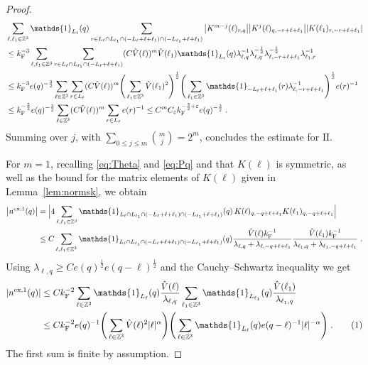 \documentclass[12pt,a4paper]{article}
\numberwithin{equation}{section}
\newcommand{\1}{\mathbb{I}}
\newcommand{\ex}{\mathrm{ex}}
\newcommand{\F}{\mathrm{F}}
\newcommand{\II}{\mathrm{II}}
\newcommand{\kF}{k_\F}
\newcommand{\tagg}[1]{ \stepcounter{equation} \tag{\theequation}
\label{#1} } %
\newcommand{\Zstar}{\mathbb{Z}^3} %
\newcommand{\Z}{\mathbb{Z}}
\newcommand{\half}{\frac{1}{2}}
\theoremstyle{plain}
\theoremstyle{definition}
\theoremstyle{remark}
\theoremstyle{plain}
\theoremstyle{definition}
\theoremstyle{remark}
\begin{document}
\begin{proof}
\begin{align}
	&\sum_{\ell,\ell_1 \in \Zstar}
		\mathds{1}_{L_\ell}(q)
		\sum_{r\in L_{\ell} \cap L_{\ell_1} \cap (-L_{\ell}+\ell+\ell_1) \cap (-L_{\ell_1}+\ell+\ell_1 )}
		\abs{K^{m-j}(\ell)_{r,q}}
		\abs{K^j(\ell)_{q,-r+\ell+\ell_1}}
		\abs{K(\ell_1)_{r,-r+\ell+\ell_1}} \nonumber\\
	&\leq \kF^{-3} \sum_{\ell,\ell_1 \in \Zstar} \sum_{r \in L_\ell \cap L_{\ell_1} \cap (-L_{\ell}+\ell+\ell_1)}
		(C \hat{V}(\ell))^m \hat{V}(\ell_1)
		\mathds{1}_{L_\ell}(q)
		\lambda_{\ell,q}^{-1} \lambda_{\ell,q}^{-\half} \lambda_{\ell,-r+\ell+\ell_1}^{-\half} \lambda_{\ell_1,r}^{-1} \nonumber\\
	&\leq \kF^{-3} e(q)^{-\frac 32} \sum_{\ell \in \Zstar} \sum_{r \in L_\ell}
		(C \hat{V}(\ell))^m
		\Bigg( \sum_{\ell_1 \in \Zstar} \hat{V}(\ell_1)^2  \Bigg)^{\half}
		\Bigg( \sum_{\ell_1 \in \Z^3} \mathds{1}_{-L_{\ell}+\ell+\ell_1}(r) \lambda_{\ell,-r+\ell+\ell_1}^{-1} \Bigg)^{\half}
		 e(r)^{-1} \nonumber\\
	&\leq \kF^{-\frac 52} e(q)^{-\frac 32} \sum_{\ell \in \Zstar} (C \hat{V}(\ell))^m
	\sum_{r \in L_\ell} e(r)^{-1}
	\leq C^m C_\varepsilon \kF^{-\frac 32 + \varepsilon} e(q)^{-\frac 32} \;.
\end{align}
Summing over $ j $, with $ \sum_{0 \le j \le m} {{m}\choose j} = 2^m $, concludes the estimate for $ \II $.

\medskip

For $ m = 1 $, recalling \eqref{eq:Theta} and \eqref{eq:Pq} and that $K(\ell)$ is symmetric, as well as the bound for the matrix elements of $K(\ell)$ given in Lemma~\ref{lem:normsk}, we obtain
\begin{align*}
	\abs{n^{\ex,1}(q)}
	& = \Big\lvert 4 \sum_{\ell,\ell_1 \in \Zstar}\mathds{1}_{L_\ell \cap L_{\ell_1} \cap (-L_{\ell}+\ell+\ell_1) \cap (-L_{\ell_1}+\ell+\ell_1)}(q)\, K(\ell)_{q,-q+\ell+\ell_1}K(\ell_1)_{q,-q+\ell+\ell_1} \Big\rvert \\
	&\leq C \sum_{\ell,\ell_1 \in \Zstar} 
		\mathds{1}_{L_\ell \cap L_{\ell_1} \cap (-L_{\ell}+\ell+\ell_1) \cap (-L_{\ell_1}+\ell+\ell_1)}(q)
		\frac{ \hat{V}(\ell) \kF^{-1}}{\lambda_{\ell,q} + \lambda_{\ell,-q+\ell+\ell_1}}
		\frac{\hat{V}(\ell_1) \kF^{-1}}{\lambda_{\ell_1,q} + \lambda_{\ell_1,-q+\ell+\ell_1}} \;.
\end{align*}
%
Using $ \lambda_{\ell,q} \ge C e(q)^{\half} e(q-\ell)^{\half} $ and the Cauchy--Schwartz inequality we get
\begin{align}
	|n^{\ex,1}(q)|
	&\leq C \kF^{-2}
		\sum_{\ell \in \Zstar} \mathds{1}_{L_\ell}(q) \frac{\hat{V}(\ell)}{\lambda_{\ell,q}}
		\sum_{\ell_1 \in \Zstar} \mathds{1}_{L_{\ell_1}}(q) \frac{\hat{V}(\ell_1)}{\lambda_{\ell_1,q}} \nonumber\\
	&\leq C \kF^{-2} e(q)^{-1}
		\Bigg( \sum_{\ell \in \Zstar} \hat{V}(\ell)^2 |\ell|^{\alpha} \Bigg)
		\Bigg( \sum_{\ell \in \Zstar} \mathds{1}_{L_\ell}(q) e(q-\ell)^{-1} |\ell|^{-\alpha} \Bigg) \;.	\tagg{eq:591}
\end{align}
The first sum is finite by assumption.


\end{proof}
\end{document}
